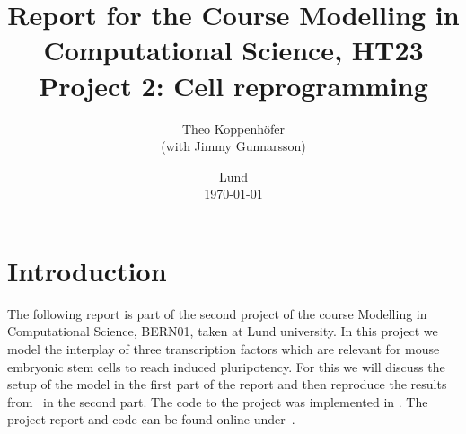 





\title{ Report for the Course Modelling in Computational Science, HT23 \\[1ex]
	  \large Project 2: Cell reprogramming}
\author{Theo Koppenhöfer \\[1ex] (with Jimmy Gunnarsson)}
\date{Lund \\[1ex] \today}



\usepackage{pythonhighlight}
\usepackage{pgfplots}
\usepackage{caption}
\graphicspath{{../Plots/}}


\newcommand{\Nover}{N_\text{over}}
\newcommand{\Oover}{O_\text{over}}
\newcommand{\Tover}{T_\text{over}}
\newcommand{\Ntotal}{\text{N}}
\newcommand{\Ototal}{\text{O}}
\newcommand{\Ttotal}{\text{T}}
\newcommand{\NT}{\text{NT}}
\newcommand{\LIF}{\text{LIF}}






\maketitle

\section{Introduction}
The following report is part of the second project of the course Modelling in Computational Science, BERN01, taken at Lund university.
In this project we model the interplay of three transcription factors which are relevant for mouse embryonic stem cells to reach induced
pluripotency.
For this we will discuss the setup of the model in the first part of the report and then reproduce the results from~\cite{Olariu2016} in the second part.
The code to the project was implemented in .
The project report and code can be found online under~\cite{Repository}.

